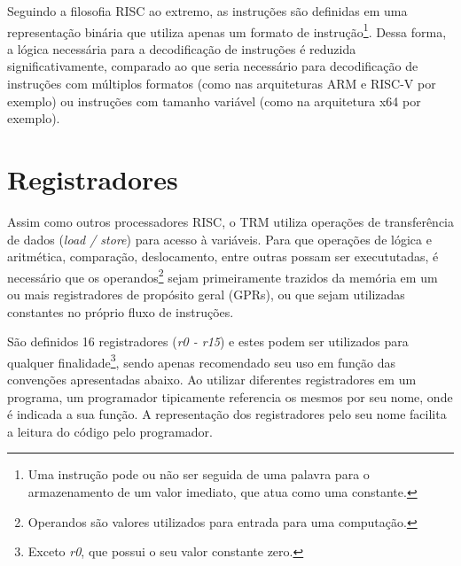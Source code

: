 \documentclass[11pt,a4paper]{report}
\begin{document}
Seguindo a filosofia RISC ao extremo, as instruções são definidas em uma
representação binária que utiliza apenas um formato de
instrução\footnote{Uma instrução pode ou não ser seguida de uma palavra
para o armazenamento de um valor imediato, que atua como uma constante.}.
Dessa forma, a lógica necessária para a decodificação de instruções é reduzida
significativamente, comparado ao que seria necessário para decodificação
de instruções com múltiplos formatos (como nas arquiteturas ARM e RISC-V
por exemplo) ou instruções com tamanho variável (como na arquitetura x64
por exemplo).

\section{Registradores}

Assim como outros processadores RISC, o TRM utiliza operações de
transferência de dados (\textit{load / store}) para acesso à variáveis.
Para que operações de lógica e aritmética, comparação, deslocamento, entre
outras possam ser execututadas, é necessário que os operandos\footnote{
Operandos são valores utilizados para entrada para uma computação.}
sejam  primeiramente trazidos da memória em um ou mais registradores de
propósito geral (GPRs), ou que sejam utilizadas constantes no próprio
fluxo de instruções.

São definidos 16 registradores (\textit{r0 - r15}) e estes podem ser
utilizados para qualquer finalidade\footnote{Exceto \textit{r0}, que
possui o seu valor constante zero.}, sendo apenas recomendado seu uso em
função das convenções apresentadas abaixo. Ao utilizar diferentes
registradores em um programa, um programador tipicamente referencia os
mesmos por seu nome, onde é indicada a sua função. A representação dos
registradores pelo seu nome facilita a leitura do código pelo programador.
\end{document}
